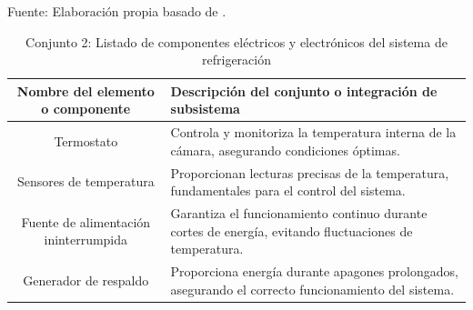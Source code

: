 	
	\begin{table}[H]
		\centering
		\caption{Conjunto 2: Listado de componentes eléctricos y electrónicos del sistema de refrigeración}
		Fuente: Elaboración propia basado de .
		\begin{tabular}{@{}cl@{}}
			\toprule
			 \begin{minipage}[t]{0.25\linewidth}\textbf{Nombre del elemento o componente}\end{minipage} & \begin{minipage}[t]{0.50\linewidth}\textbf{Descripción del conjunto o integración de subsistema}\end{minipage} \\
			
			 \midrule
			Termostato                                & \begin{minipage}[t]{0.5\linewidth}Controla y monitoriza la temperatura interna de la cámara, asegurando condiciones óptimas.\end{minipage} \\
			 Sensores de temperatura                   & \begin{minipage}[t]{0.5\linewidth}Proporcionan lecturas precisas de la temperatura, fundamentales para el control del sistema.\end{minipage} \\
			Fuente de alimentación ininterrumpida & \begin{minipage}[t]{0.5\linewidth}Garantiza el funcionamiento continuo durante cortes de energía, evitando fluctuaciones de temperatura.\end{minipage} \\
			 Generador de respaldo                     & \begin{minipage}[t]{0.5\linewidth}Proporciona energía durante apagones prolongados, asegurando el correcto funcionamiento del sistema.\end{minipage} \\ \bottomrule
		\end{tabular}
		\label{tabla:electricos}
	\end{table}
	
